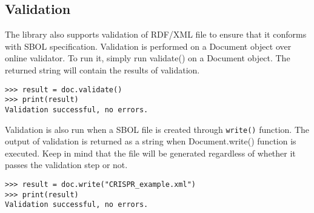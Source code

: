 \subsection*{Validation}
The library also supports validation of RDF/XML file to ensure that it conforms with SBOL specification. Validation is performed on a Document object over online validator. To run it, simply run validate() on a Document object. The returned string will contain the results of validation.

\vspace{\abovedisplayskip}
\begin{minipage}{0.95\textwidth} 
\begin{lstlisting}
>>> result = doc.validate()
>>> print(result)
Validation successful, no errors.
\end{lstlisting}
\end{minipage}

Validation is also run when a SBOL file is created through \lstinline+write()+ function. The output of validation is returned as a string when Document.write() function is executed. Keep in mind that the file will be generated regardless of whether it passes the validation step or not.

\vspace{\abovedisplayskip}
\begin{minipage}{0.95\textwidth} 
\begin{lstlisting}
>>> result = doc.write("CRISPR_example.xml")
>>> print(result)
Validation successful, no errors.
\end{lstlisting}
\end{minipage}



